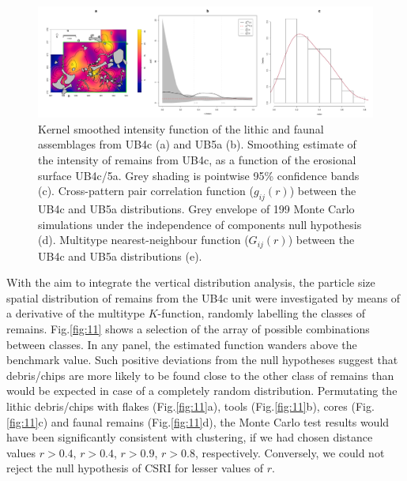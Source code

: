 \documentclass[preprint,authoryear,times]{elsarticle} %
\begin{document}
\begin{figure}[]
  \centering
  \includegraphics[width=1\textwidth]{../artwork/Fig10.pdf}
  \caption{Kernel smoothed intensity function of the lithic and faunal assemblages from UB4c (a) and UB5a (b). Smoothing estimate of the intensity of remains from UB4c, as a function of the erosional surface UB4c/5a. Grey shading is pointwise 95\% confidence bands (c). Cross-pattern pair correlation function ($g_{ij}(r)$) between the UB4c and UB5a distributions. Grey envelope of 199 Monte Carlo simulations under the independence of components null hypothesis (d). Multitype nearest-neighbour function ($G_{ij}(r)$) between the UB4c and UB5a distributions (e).}
  \label{fig:10}
\end{figure}

With the aim to integrate the vertical distribution analysis, the particle size spatial distribution of remains from the UB4c unit were investigated by means of a derivative of the multitype $K$-function, randomly labelling the classes of remains. Fig.\ref{fig:11} shows a selection of the array of possible combinations between classes. In any panel, the estimated function wanders above the benchmark value. Such positive deviations from the null hypotheses suggest that debris/chips are more likely to be found close to the other class of remains than would be expected in case of a completely random distribution. Permutating the lithic debris/chips with flakes (Fig.\ref{fig:11}a), tools (Fig.\ref{fig:11}b), cores (Fig.\ref{fig:11}c) and faunal remains (Fig.\ref{fig:11}d), the Monte Carlo test results would have been significantly consistent with clustering, if we had chosen distance values $r > 0.4$, $r > 0.4$, $r > 0.9$, $r > 0.8$, respectively. Conversely, we could not reject the null hypothesis of CSRI for lesser values of $r$.
\end{document}
